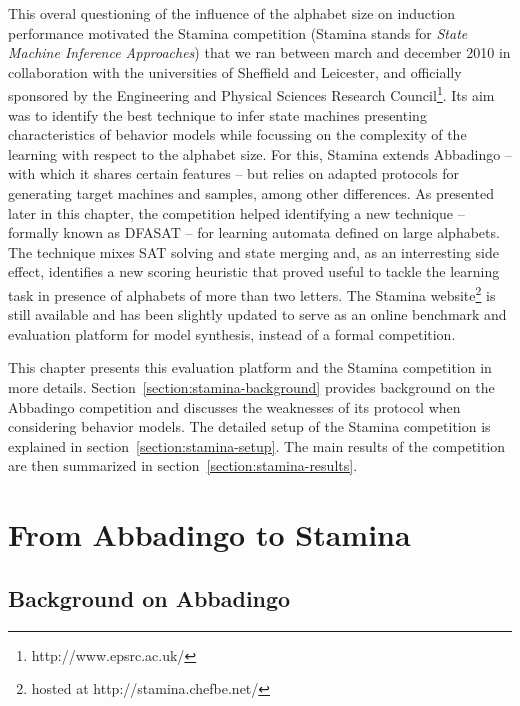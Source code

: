 This overal questioning of the influence of the alphabet size on induction performance motivated the Stamina competition (Stamina stands for \emph{State Machine Inference Approaches}) that we ran between march and december 2010 in collaboration with the universities of Sheffield and Leicester, and officially sponsored by the Engineering and Physical Sciences Research Council\footnote{http://www.epsrc.ac.uk/}. Its aim was to identify the best technique to infer state machines presenting characteristics of behavior models while focussing on the complexity of the learning with respect to the alphabet size. For this, Stamina extends Abbadingo -- with which it shares certain features -- but relies on adapted protocols for generating target machines and samples, among other differences. As presented later in this chapter, the competition helped identifying a new technique -- formally known as DFASAT -- for learning automata defined on large alphabets. The technique mixes SAT solving and state merging and, as an interresting side effect, identifies a new scoring heuristic that proved useful to tackle the learning task in presence of alphabets of more than two letters. The Stamina website\footnote{hosted at http://stamina.chefbe.net/} is still available and has been slightly updated to serve as an online benchmark and evaluation platform for model synthesis, instead of a formal competition.

This chapter presents this evaluation platform and the Stamina competition in more details. Section~\ref{section:stamina-background} provides background on the Abbadingo competition and discusses the weaknesses of its protocol when considering behavior models. The detailed setup of the Stamina competition is explained in section~\ref{section:stamina-setup}. The main results of the competition are then summarized in section~\ref{section:stamina-results}.

\section{From Abbadingo to Stamina\label{section:stamina-background}}

\subsection{Background on Abbadingo}

